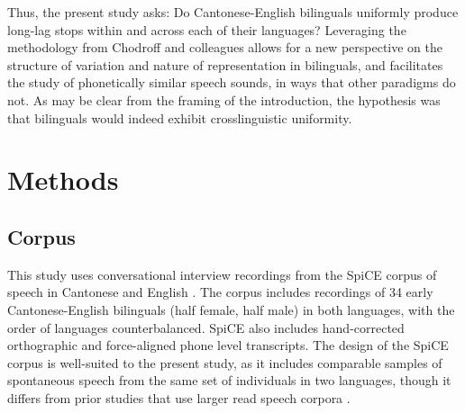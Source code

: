 Thus, the present study asks: Do Cantonese-English bilinguals uniformly produce long-lag stops within and across each of their languages? Leveraging the methodology from Chodroff and colleagues \citep{chodroff_2017_structure,chodroff_2018_predictability,chodroff_2019_l2} allows for a new perspective on the structure of variation and nature of representation in bilinguals, and facilitates the study of phonetically similar speech sounds, in ways that other paradigms do not. As may be clear from the framing of the introduction, the hypothesis was that bilinguals would indeed exhibit crosslinguistic uniformity.

\section{Methods}


\subsection{Corpus}
This study uses conversational interview recordings from the SpiCE corpus of speech in Cantonese and English \citep{johnson_2020_spice}. The corpus includes recordings of 34 early Cantonese-English bilinguals (half female, half male) in both languages, with the order of languages counterbalanced. SpiCE also includes hand-corrected orthographic and force-aligned phone level transcripts. The design of the SpiCE corpus is well-suited to the present study, as it includes comparable samples of spontaneous speech from the same set of individuals in two languages, though it differs from prior studies that use larger read speech corpora \citep{chodroff_2017_structure,chodroff_2019_l2}.

